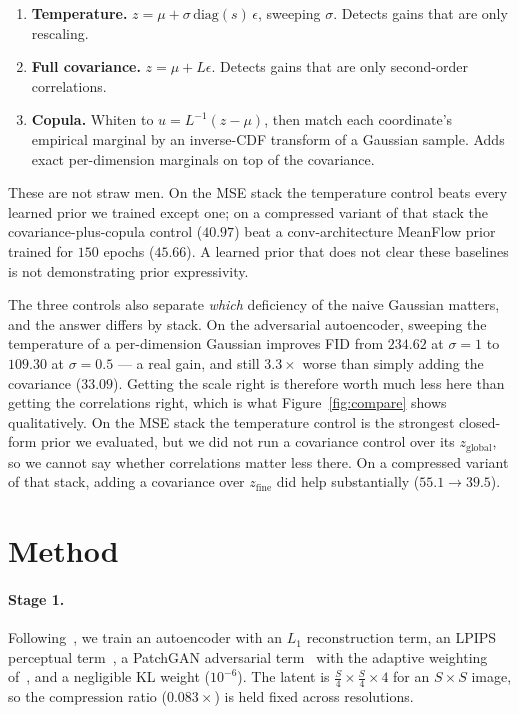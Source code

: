 \documentclass[sigconf,nonacm]{acmart}
\newcommand{\zg}{z_{\mathrm{global}}}
\newcommand{\zf}{z_{\mathrm{fine}}}
\begin{document}
\begin{enumerate}
\item \textbf{Temperature.} $z = \mu + \sigma\,\mathrm{diag}(s)\,\epsilon$,
sweeping $\sigma$. Detects gains that are only rescaling.
\item \textbf{Full covariance.} $z = \mu + L\epsilon$. Detects gains that are
only second-order correlations.
\item \textbf{Copula.} Whiten to $u = L^{-1}(z-\mu)$, then match each
coordinate's empirical marginal by an inverse-CDF transform of a Gaussian
sample. Adds exact per-dimension marginals on top of the covariance.
\end{enumerate}

These are not straw men. On the MSE stack the temperature control beats every
learned prior we trained except one; on a compressed variant of that stack the
covariance-plus-copula control ($40.97$) beat a conv-architecture MeanFlow
prior trained for $150$ epochs ($45.66$). A learned prior that does not clear
these baselines is not demonstrating prior expressivity.

The three controls also separate \emph{which} deficiency of the naive Gaussian
matters, and the answer differs by stack. On the adversarial autoencoder,
sweeping the temperature of a per-dimension Gaussian improves FID from $234.62$
at $\sigma{=}1$ to $109.30$ at $\sigma{=}0.5$ --- a real gain, and still $3.3\times$
worse than simply adding the covariance ($33.09$). Getting the scale right is
therefore worth much less here than getting the correlations right, which is
what Figure~\ref{fig:compare} shows qualitatively. On the MSE stack the temperature
control is the strongest closed-form prior we evaluated, but we did not run a
covariance control over its $\zg$, so we cannot say whether correlations matter
less there. On a compressed variant of that stack, adding a covariance over
$\zf$ did help substantially ($55.1 \to 39.5$).

\section{Method}
\label{sec:method}

\paragraph{Stage 1.}
Following~\cite{ldm}, we train an autoencoder with an $L_1$ reconstruction
term, an LPIPS perceptual term~\cite{lpips}, a PatchGAN adversarial
term~\cite{patchgan} with the adaptive weighting of~\cite{ldm}, and a
negligible KL weight ($10^{-6}$). The latent is $\tfrac{S}{4}\times
\tfrac{S}{4}\times 4$ for an $S\times S$ image, so the compression ratio
($0.083\times$) is held fixed across resolutions.
\end{document}
